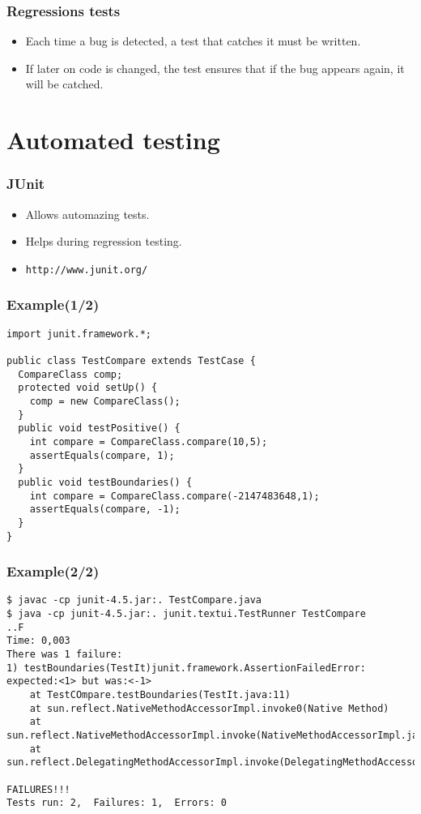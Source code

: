 \documentclass[10pt]{beamer}
\begin{document}
\begin{frame}[fragile]
  \frametitle{Regressions tests}
  \begin{itemize}
    \item Each time a bug is detected, a test that catches it must be written.
    \item If later on code is changed, the test ensures that if the bug appears
      again, it will be catched.
  \end{itemize}
\end{frame}

\section{Automated testing}
\begin{frame}[fragile]
  \frametitle{JUnit}
  \begin{itemize}
    \item Allows automazing tests.
    \item Helps during regression testing.
    \item \verb!http://www.junit.org/!
  \end{itemize}
\end{frame}

\begin{frame}[fragile]
  \frametitle{Example(1/2)}
\begin{verbatim}
import junit.framework.*;

public class TestCompare extends TestCase {
  CompareClass comp;
  protected void setUp() {
    comp = new CompareClass();
  }
  public void testPositive() {
    int compare = CompareClass.compare(10,5);
    assertEquals(compare, 1);
  }
  public void testBoundaries() {
    int compare = CompareClass.compare(-2147483648,1);
    assertEquals(compare, -1);
  }
}
\end{verbatim}
\end{frame}

\begin{frame}
  \frametitle{Example(2/2)}
\tiny
\begin{verbatim}
$ javac -cp junit-4.5.jar:. TestCompare.java
$ java -cp junit-4.5.jar:. junit.textui.TestRunner TestCompare
..F
Time: 0,003
There was 1 failure:
1) testBoundaries(TestIt)junit.framework.AssertionFailedError: expected:<1> but was:<-1>
	at TestCOmpare.testBoundaries(TestIt.java:11)
	at sun.reflect.NativeMethodAccessorImpl.invoke0(Native Method)
	at sun.reflect.NativeMethodAccessorImpl.invoke(NativeMethodAccessorImpl.java:39)
	at sun.reflect.DelegatingMethodAccessorImpl.invoke(DelegatingMethodAccessorImpl.java:25)

FAILURES!!!
Tests run: 2,  Failures: 1,  Errors: 0
\end{verbatim}
\end{frame}
\end{document}
